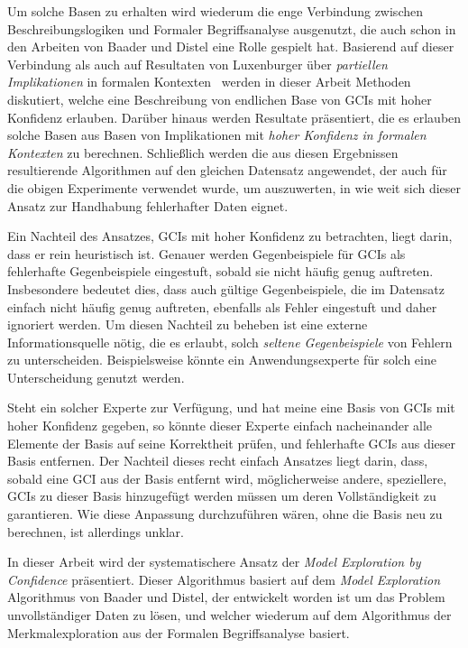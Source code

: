 \documentclass[ngerman,fleqn,DIV=12]{scrartcl}
\begin{document}
Um solche Basen zu erhalten wird wiederum die enge Verbindung zwischen
Beschreibungslogiken und Formaler Begriffsanalyse ausgenutzt, die auch schon in den
Arbeiten von Baader und Distel eine Rolle gespielt hat.  Basierend auf dieser Verbindung
als auch auf Resultaten von Luxenburger über \emph{partiellen Implikationen} in formalen
Kontexten~\cite{diss:Luxenburger} werden in dieser Arbeit Methoden diskutiert, welche eine
Beschreibung von endlichen Base von GCIs mit hoher Konfidenz erlauben.  Darüber hinaus
werden Resultate präsentiert, die es erlauben solche Basen aus Basen von Implikationen mit
\emph{hoher Konfidenz in formalen Kontexten} zu berechnen.  Schließlich werden die aus
diesen Ergebnissen resultierende Algorithmen auf den gleichen Datensatz angewendet, der
auch für die obigen Experimente verwendet wurde, um auszuwerten, in wie weit sich dieser
Ansatz zur Handhabung fehlerhafter Daten eignet.

Ein Nachteil des Ansatzes, GCIs mit hoher Konfidenz zu betrachten, liegt darin, dass er
rein heuristisch ist.  Genauer werden Gegenbeispiele für GCIs als fehlerhafte
Gegenbeispiele eingestuft, sobald sie nicht häufig genug auftreten.  Insbesondere bedeutet
dies, dass auch gültige Gegenbeispiele, die im Datensatz einfach nicht häufig genug
auftreten, ebenfalls als Fehler eingestuft und daher ignoriert werden.  Um diesen Nachteil
zu beheben ist eine externe Informationsquelle nötig, die es erlaubt, solch \emph{seltene
  Gegenbeispiele} von Fehlern zu unterscheiden.  Beispielsweise könnte ein
Anwendungsexperte für solch eine Unterscheidung genutzt werden.

Steht ein solcher Experte zur Verfügung, und hat meine eine Basis von GCIs mit hoher
Konfidenz gegeben, so könnte dieser Experte einfach nacheinander alle Elemente der Basis
auf seine Korrektheit prüfen, und fehlerhafte GCIs aus dieser Basis entfernen.  Der
Nachteil dieses recht einfach Ansatzes liegt darin, dass, sobald eine GCI aus der Basis
entfernt wird, möglicherweise andere, speziellere, GCIs zu dieser Basis hinzugefügt werden
müssen um deren Vollständigkeit zu garantieren.  Wie diese Anpassung durchzuführen wären,
ohne die Basis neu zu berechnen, ist allerdings unklar.

In dieser Arbeit wird der systematischere Ansatz der \emph{Model Exploration by
  Confidence} präsentiert.  Dieser Algorithmus basiert auf dem \emph{Model Exploration}
Algorithmus von Baader und Distel, der entwickelt worden ist um das Problem
unvollständiger Daten zu lösen, und welcher wiederum auf dem Algorithmus der
Merkmalexploration aus der Formalen Begriffsanalyse basiert.
\end{document}

